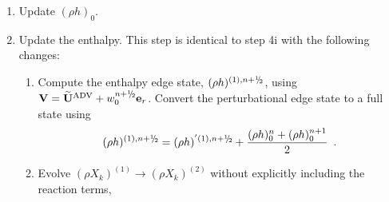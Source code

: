 \begin{description}
\begin{enumerate}
\item Update $(\rho h)_0$.

\item Update the enthalpy.  This step is identical to step 4i with the following changes:

\begin{enumerate}
\renewcommand{\labelenumii}{{\bf \roman{enumii}}.}

\item Compute the enthalpy edge state, $(\rho h)^{(1),\nph}$, using
$\Vb = \uadvtwo+w_0^{\nph} \eb_r$.  Convert the perturbational edge 
state to a full state using
\begin{equation}
(\rho h)^{(1),\nph} = 
(\rho h)^{'(1),\nph} + \frac{(\rho h)_0^n + (\rho h)_0^{n+1}}{2} \enskip .
\end{equation}

\item Evolve $(\rho X_k)^{(1)} \rightarrow (\rho X_k)^{(2)}$
without explicitly including the reaction terms,

\end{enumerate}
\end{enumerate}
\end{description}

